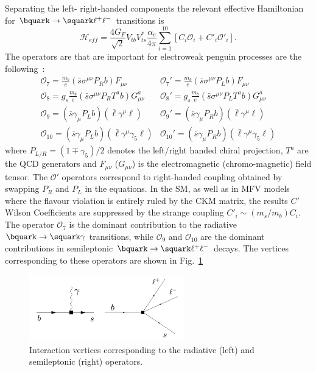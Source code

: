 Separating the left- right-handed components the relevant effective Hamiltonian
for $\bquark\to\squark\ell^+\ell^-$ transitions is
%
\begin{equation}
\mathcal{H}_{eff} = \frac{4G_F}{\sqrt{2}} V_{tb}V^*_{ts} \frac{\alpha_e}{4\pi} \sum_{i=1}^{10} \left[ C_i \mathcal{O}_i  +  C'_i \mathcal{O}'_i \right].
\end{equation}
%
The operators are that are important for electroweak penguin processes are the following~\cite{TomRDreview}:
%
\begin{equation}
\begin{array}{ll}
 \mathcal{O}_7 = \frac{m_b}{e} (\bar{s} \sigma^{\mu\nu}P_Rb)F_{\mu\nu}  		& \mathcal{O}_7' = \frac{m_b}{e} (\bar{s} \sigma^{\mu\nu}P_Lb)F_{\mu\nu} \\
\mathcal{O}_8 = g_s\frac{m_b}{e} (\bar{s} \sigma^{\mu\nu}P_RT^ab)G^a_{\mu\nu}  	& \mathcal{O}_8' = g_s\frac{m_b}{e} (\bar{s} \sigma^{\mu\nu}P_LT^ab)G^a_{\mu\nu} \\
\mathcal{O}_9 = (\bar{s} \gamma_{\mu}P_Lb)(\bar{\ell}\gamma^\mu\ell) 			& \mathcal{O}_9' = (\bar{s} \gamma_{\mu}P_Rb)(\bar{\ell}\gamma^\mu\ell) \\
\mathcal{O}_{10} = (\bar{s} \gamma_{\mu}P_Lb)(\bar{\ell}\gamma^\mu\gamma_5\ell) 	& \mathcal{O}_{10}' = (\bar{s} \gamma_{\mu}P_Rb)(\bar{\ell}\gamma^\mu\gamma_5\ell)
\end{array}
\end{equation}
%
where $P_{L/R} = (1 \mp \gamma_5)/2$ denotes the left/right handed chiral projection,
$T^a$ are the QCD generators and $F_{\mu\nu}$ ($G_{\mu\nu}$) is the electromagnetic
(chromo-magnetic) field tensor.
%
The $\mathcal{O}'$ operators correspond to right-handed coupling obtained by swapping
$P_R$ and $P_L$ in the equations. In the SM, as well as in MFV models where the
flavour violation is entirely ruled by the CKM matrix, the results $C'$ Wilson Coefficients 
are suppressed by the strange coupling $C'_i \sim (m_s / m_b) C_i$.
%
The operator $\mathcal{O}_7$ is the dominant contribution to the radiative 
$\bquark\to\squark\gamma$ transitions, while $\mathcal{O}_9$ and $ \mathcal{O}_{10}$
are the dominant contributions in semileptonic $\bquark\to\squark\ell^+\ell^-$ decays.
The vertices corresponding to these operators are shown in Fig.~\ref{fig:vtx_operators}
%
\begin{figure}[h!]
\centering
\includegraphics[width=0.6\textwidth]{Introduction/figs/vtx_operators.png}
\caption{Interaction vertices corresponding to the radiative (left) and semileptonic (right) operators.}
\label{fig:vtx_operators}
\end{figure}

